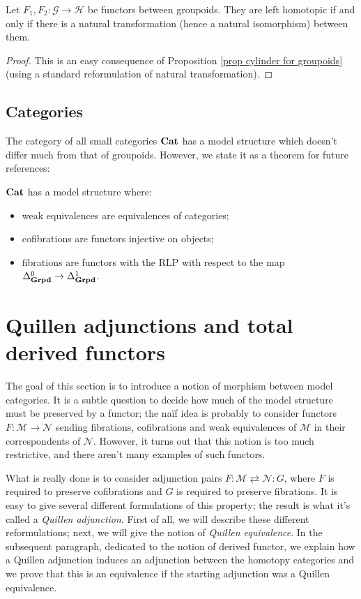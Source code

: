 \begin{cor}
Let $F_1,F_2 \colon \mathcal G \to \mathcal H$ be functors between groupoids. They are left homotopic if and only if there is a natural transformation (hence a natural isomorphism) between them.
\end{cor}

\begin{proof}
This is an easy consequence of Proposition \ref{prop cylinder for groupoids} (using a standard reformulation of natural transformation).
\end{proof}

\subsection{Categories} \label{model structure on cat}

The category of all small categories $\mathbf{Cat}$ has a model structure which doesn't differ much from that of groupoids. However, we state it as a theorem for future references:

\begin{thm} \label{thm model structure on cat}
$\mathbf{Cat}$ has a model structure where:
\begin{itemize}
\item weak equivalences are equivalences of categories;
\item cofibrations are functors injective on objects;
\item fibrations are functors with the RLP with respect to the map $\Delta^0_{\mathbf{Grpd}} \to \Delta^1_{\mathbf{Grpd}}$.
\end{itemize}
\end{thm}


\section{Quillen adjunctions and total derived functors}

The goal of this section is to introduce a notion of morphism between model categories. It is a subtle question to decide how much of the model structure must be preserved by a functor; the na\"if idea is probably to consider functors $F \colon \mathcal M \to \mathcal N$ sending fibrations, cofibrations and weak equivalences of $\mathcal M$ in their correspondents of $\mathcal N$. However, it turns out that this notion is too much restrictive, and there aren't many examples of such functors.

What is really done is to consider adjunction pairs $F \colon \mathcal M \rightleftarrows \mathcal N \colon G$, where $F$ is required to preserve cofibrations and $G$ is required to preserve fibrations. It is easy to give several different formulations of this property; the result is what it's called a \emph{Quillen adjunction}. First of all, we will describe these different reformulations; next, we will give the notion of \emph{Quillen equivalence}. In the subsequent paragraph, dedicated to the notion of derived functor, we explain how a Quillen adjunction induces an adjunction between the homotopy categories and we prove that this is an equivalence if the starting adjunction was a Quillen equivalence.

